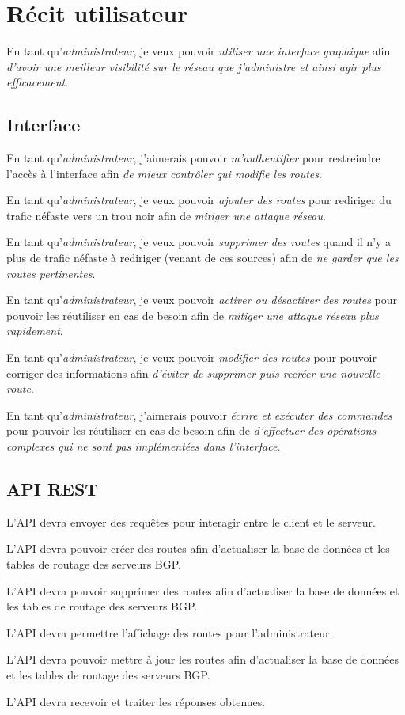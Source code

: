 \chapter{Récit utilisateur}

 En tant qu'\textit{administrateur}, je veux pouvoir \textit{utiliser une interface graphique} afin \textit{d'avoir une meilleur visibilité sur le réseau que j'administre et ainsi agir plus efficacement}.

\section{Interface}

En tant qu'\textit{administrateur}, j'aimerais pouvoir \textit{m'authentifier} pour restreindre l'accès à l'interface afin \textit{de mieux contrôler qui modifie les routes}.\bigskip

En tant qu'\textit{administrateur}, je veux pouvoir \textit{ajouter des routes} pour rediriger du trafic néfaste vers un trou noir afin de \textit{mitiger une attaque réseau}.\bigskip

En tant qu'\textit{administrateur}, je veux pouvoir \textit{supprimer des routes} quand il n'y a plus de trafic néfaste à rediriger (venant de ces sources) afin de \textit{ne garder que les routes pertinentes}.\bigskip

En tant qu'\textit{administrateur}, je veux pouvoir \textit{activer ou désactiver des routes} pour pouvoir les réutiliser en cas de besoin afin de \textit{mitiger une attaque réseau plus rapidement}.\bigskip

En tant qu'\textit{administrateur}, je veux pouvoir \textit{modifier des routes} pour pouvoir corriger des informations afin \textit{d'éviter de supprimer puis recréer une nouvelle route}.\bigskip

 En tant qu'\textit{administrateur}, j'aimerais pouvoir \textit{écrire et exécuter des commandes} pour pouvoir les réutiliser en cas de besoin afin de \textit{d'effectuer des opérations complexes qui ne sont pas implémentées dans l'interface}.\bigskip

 \newpage

\section{API REST}
L'API devra envoyer des requêtes pour interagir entre le client et le serveur.\bigskip

L'API devra pouvoir créer des routes afin d'actualiser la base de données et les tables de routage des serveurs BGP.\bigskip

L'API devra pouvoir supprimer des routes afin d'actualiser la base de données et les tables de routage des serveurs BGP.\bigskip

L'API devra permettre l'affichage des routes pour l'administrateur.\bigskip

L'API devra pouvoir mettre à jour les routes afin d'actualiser la base de données et les tables de routage des serveurs BGP.\bigskip

L'API devra recevoir et traiter les réponses obtenues.\bigskip
